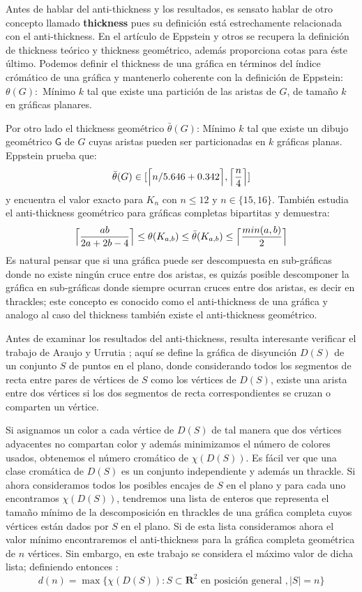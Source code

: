 Antes de hablar del anti-thickness y los resultados, es sensato hablar de otro
concepto llamado \textbf{thickness} pues su definición está estrechamente
relacionada con el anti-thickness. En el artículo de Eppstein y otros
\cite{Dillencourt2004} se recupera la definición de thickness teórico y thickness
geométrico, además proporciona cotas para éste último. Podemos definir el
thickness de una gráfica en términos del índice crómático de una gráfica y
mantenerlo coherente con la definición de Eppstein: $\theta(G):$ Mínimo $k$
tal que existe una partición de las aristas de $G$, de tamaño $k$ en gráficas planares.

Por otro lado el thickness geométrico $\bar{\theta}(G)$: Mínimo $k$ tal que
existe un dibujo geométrico $\mathsf{G}$ de $G$ cuyas aristas pueden ser
particionadas en $k$ gráficas planas. Eppstein prueba que:
\[ \bar{\theta}(G) \in [\Bigl\lceil n/5.646 + 0.342 \Bigr\rceil, \Bigl\lceil\frac{n}{4}\Bigr\rceil] \]
y encuentra el valor exacto para $K_n$ con $n\leq 12$ y $n\in\{15,16\}$. También
estudia el anti-thickness geométrico para gráficas completas bipartitas y demuestra:
\[
  \Bigl\lceil \frac{ab}{2a+2b-4} \Bigr\rceil \leq \theta(K_{a,b}) \leq \bar{\theta}(K_{a,b})
  \leq \Bigl\lceil \frac{min(a,b)}{2} \Bigr\rceil
\]
Es natural pensar que si una gráfica puede ser descompuesta en sub-gráficas donde
no existe ningún cruce entre dos aristas, es quizás posible descomponer la
gráfica en sub-gráficas donde siempre ocurran cruces entre dos aristas, es decir
en thrackles; este concepto es conocido como el anti-thickness de una gráfica y
analogo al caso del thickness también existe el anti-thickness geométrico.

Antes de examinar los resultados del anti-thickness, resulta interesante verificar
el trabajo de Araujo y Urrutia \cite{Araujo2005}; aquí se define la gráfica de
disyunción $D(S)$ de un conjunto $S$ de puntos en el plano, donde considerando
todos los segmentos de recta entre pares de vértices de $S$ como los vértices
de $D(S)$, existe una arista entre dos vértices si los dos segmentos
de recta correspondientes se cruzan o comparten un vértice.

Si asignamos un color a cada vértice de $D(S)$ de tal manera que dos
vértices adyacentes no compartan color y además minimizamos el número de colores
usados, obtenemos el número cromático de $\chi(D(S))$. Es fácil ver que una
clase cromática de $D(S)$ es un conjunto independiente y además un thrackle. Si
ahora consideramos todos los posibles encajes de $S$ en el plano y para cada uno
encontramos $\chi(D(S))$, tendremos una lista de enteros que representa el tamaño
mínimo de la descomposición en thrackles de una gráfica completa cuyos
vértices están dados por $S$ en el plano. Si de esta lista consideramos ahora
el valor mínimo encontraremos el anti-thickness para la gráfica completa geométrica de
$n$ vértices. Sin embargo, en este trabajo se considera el máximo valor de dicha lista;
definiendo entonces :
\[ d(n) = \max\{\chi(D(S)): S \subset \mathbf{R}^2 \text{ en posición general }, |S|=n\}\]

